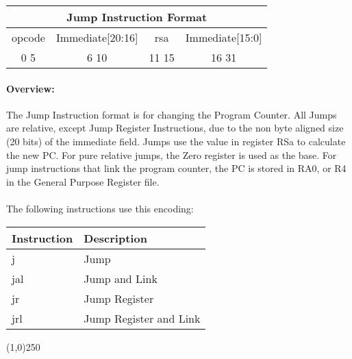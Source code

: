 \documentclass[letterpaper, 11pt]{article}
\begin{document}
\begin{center}
		\begin{tabular}{|c|c|c|c|}
				\multicolumn{4}{c}{Jump Instruction Format}\\ \hline
				\hspace{2pt} opcode \hspace{2pt}  & \hspace{3pt} Immediate[20:16] \hspace{3pt} &  \hspace{4pt} rsa \hspace{4pt} & \hspace{10pt} Immediate[15:0]  \hspace{10pt}   \\	\hline
							0 \hfill 5&6  \hfill 10&11 \hfill  15&16 \hfill   31\\ \hline
		
	\end{tabular}
\end{center}	
\paragraph{Overview:} The Jump Instruction format is for changing the Program Counter. 
All Jumps are relative, except Jump Register Instructions,
due to the non byte aligned size (20 bits) of the immediate field. Jumps use the value in register RSa to calculate
the new PC. For pure relative jumps, the Zero register is used as the base. For jump instructions that link the program counter, 
the PC is stored in RA0, or R4 in the General Purpose Register file.
\paragraph{}The following instructions use this encoding: \\
\begin{center}
	\begin{tabular}{|l|l|} \hline
			Instruction & Description 				\\ \hline
			j			& Jump						\\ \hline
			jal			& Jump and Link				\\ \hline
			jr			& Jump Register				\\ \hline
			jrl			& Jump Register and Link	\\ \hline


\end{tabular}
\end{center}
\begin{center}
	\line(1,0){250}
\end{center}
\end{document}
